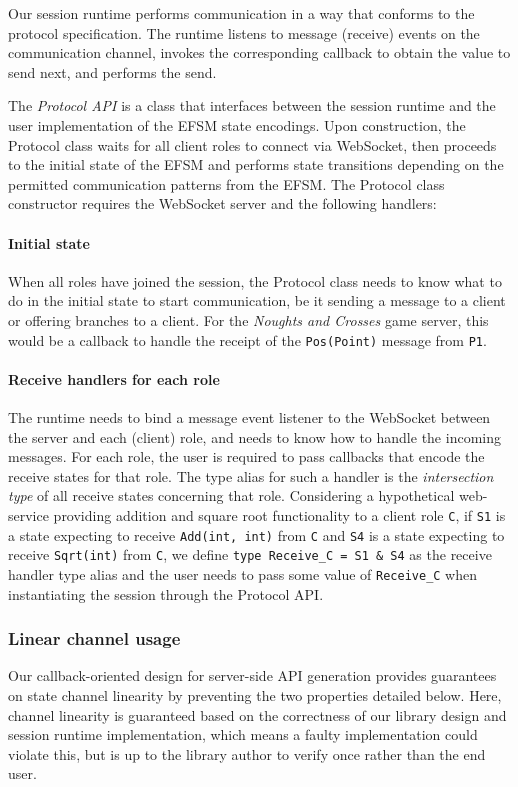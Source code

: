 \documentclass[submission,copyright,creativecommons]{eptcs}
\begin{document}
Our session runtime performs communication in a way that conforms to the protocol specification. The runtime listens to message (receive) events on the communication channel, invokes the corresponding callback to obtain the value to send next, and performs the send.

The \textit{Protocol API} is a class that interfaces between the session runtime and the user implementation of the EFSM state encodings. Upon construction, the Protocol class waits for all client roles to connect via WebSocket, then proceeds to the initial state of the EFSM and performs state transitions depending on the permitted communication patterns from the EFSM. The Protocol class constructor requires the WebSocket server and the following handlers:

\paragraph{Initial state} When all roles have joined the session, the Protocol class needs to know what to do in the initial state to start communication, be it sending a message to a client or offering branches to a client. For the \textit{Noughts and Crosses} game server, this would be a callback to handle the receipt of the \texttt{Pos(Point)} message from \texttt{P1}.

\paragraph{Receive handlers for each role} The runtime needs to bind a message event listener to the WebSocket between the server and each (client) role, and needs to know how to handle the incoming messages. For each role, the user is required to pass callbacks that encode the receive states for that role. The type alias for such a handler is the \textit{intersection type} \cite{TypeScriptSpec} of all receive states concerning that role. Considering a hypothetical web-service providing addition and square root functionality to a client role \texttt{C}, if \texttt{S1} is a state expecting to receive \texttt{Add(int, int)} from \texttt{C} and \texttt{S4} is a state expecting to receive \texttt{Sqrt(int)} from \texttt{C}, we define \texttt{type Receive_C = S1 \& S4} as the receive handler type alias and the user needs to pass some value of \texttt{Receive_C} when instantiating the session through the Protocol API. 

\subsubsection{Linear channel usage}
\label{section:serverlinear}
Our callback-oriented design for server-side API generation provides guarantees on state channel linearity by preventing the two properties detailed below. Here, channel linearity is guaranteed based on the correctness of our library design and session runtime implementation, which means a faulty implementation could violate this, but is up to the library author to verify once rather than the end user.
\end{document}
